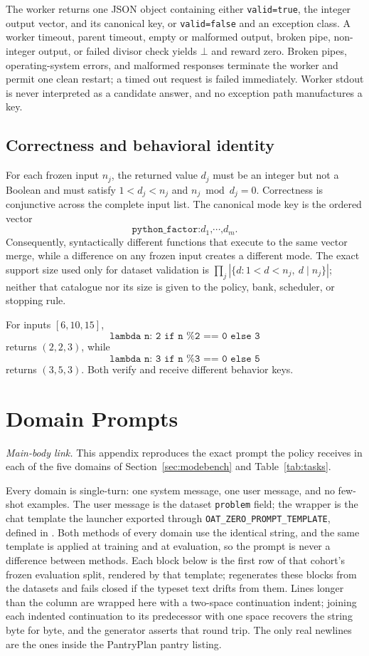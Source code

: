 The worker returns one JSON object containing either
\texttt{valid=true}, the integer output vector, and its canonical key, or
\texttt{valid=false} and an exception class. A worker timeout, parent timeout,
empty or malformed output, broken pipe, non-integer output, or failed divisor
check yields $\bot$ and reward zero. Broken pipes, operating-system errors, and
malformed responses terminate the worker and permit one clean restart; a timed
out request is failed immediately. Worker stdout is never interpreted as a
candidate answer, and no exception path manufactures a key.

\subsection{Correctness and behavioral identity}
\label{app:python-identity}

For each frozen input $n_j$, the returned value $d_j$ must be an integer but
not a Boolean and must satisfy $1<d_j<n_j$ and
$n_j\bmod d_j=0$. Correctness is conjunctive across the complete input list.
The canonical mode key is the ordered vector
\[
  \texttt{python\_factor:}d_1\texttt{,}\cdots\texttt{,}d_m .
\]
Consequently, syntactically different functions that execute to the same
vector merge, while a difference on any frozen input creates a different
mode. The exact support size used only for dataset validation is
$\prod_j |\{d:1<d<n_j,\ d\mid n_j\}|$; neither that catalogue nor its size is
given to the policy, bank, scheduler, or stopping rule.

For inputs $[6,10,15]$,
\[
\texttt{lambda n: 2 if n \% 2 == 0 else 3}
\]
returns $(2,2,3)$, while
\[
\texttt{lambda n: 3 if n \% 3 == 0 else 5}
\]
returns $(3,5,3)$. Both verify and receive different behavior keys.

\clearpage
\section{Domain Prompts}
\label{app:prompts}

\noindent\emph{Main-body link.} This appendix reproduces the exact prompt the
policy receives in each of the five \mb{} domains of
Section~\ref{sec:modebench} and Table~\ref{tab:tasks}.

Every domain is single-turn: one system message, one user message, and no
few-shot examples. The user message is the dataset \texttt{problem} field; the
wrapper is the chat template the launcher exported through
\texttt{OAT\_ZERO\_PROMPT\_TEMPLATE}, defined in
. Both methods of every domain use the identical
string, and the same template is applied at training and at evaluation, so the
prompt is never a difference between methods. Each block below is the first row of
that cohort's frozen evaluation split, rendered by that template;
 regenerates these blocks from the
datasets and fails closed if the typeset text drifts from them. Lines longer
than the column are wrapped here with a two-space continuation indent; joining
each indented continuation to its predecessor with one space recovers the
string byte for byte, and the generator asserts that round trip. The only real
newlines are the ones inside the PantryPlan pantry listing.


